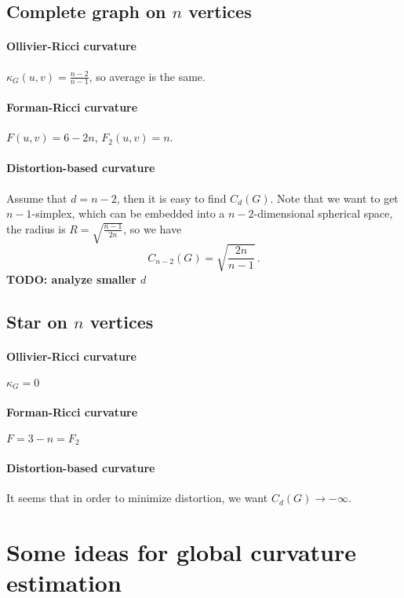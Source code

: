 \documentclass{article}
\begin{document}
\subsection{Complete graph on $n$ vertices}

\paragraph{Ollivier-Ricci curvature} 
        
$\kappa_G(u,v) = \frac{n-2}{n-1}$, so average is the same.

\paragraph{Forman-Ricci curvature} $F(u,v) = 6 - 2n$, $F_2(u,v) = n$.

\paragraph{Distortion-based curvature} Assume that $d = n-2$, then it is easy to find $C_d(G)$. Note that we want to get $n-1$-simplex, which can be embedded into a $n-2$-dimensional spherical space, the radius is $R = \sqrt{\frac{n-1}{2n}}$, so we have
\[
C_{n-2}(G) = \sqrt{\frac{2n}{n-1}}\,.
\]
\textbf{TODO: analyze smaller $d$}

\subsection{Star on $n$ vertices}

\paragraph{Ollivier-Ricci curvature} $\kappa_G = 0$

\paragraph{Forman-Ricci curvature} $F = 3-n = F_2$

\paragraph{Distortion-based curvature} It seems that in order to minimize distortion, we want $C_d(G) \to -\infty$.
    
\section{Some ideas for global curvature estimation}
\end{document}
